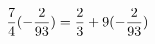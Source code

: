\documentclass[preview]{standalone}
\begin{document}
\begin{align*}
\special{dvisvgm:raw <g id='unique000'>}\frac{7}{4} (- \frac{2}{93}) = \frac{2}{3} + 9(- \frac{2}{93})\special{dvisvgm:raw </g>}
\end{align*}
\end{document}
